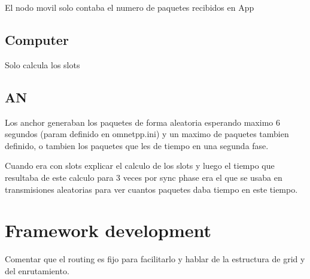El nodo movil solo contaba el numero de paquetes recibidos en App

\subsection{Computer}

Solo calcula los slots

\subsection{\ac{AN}}

Los anchor generaban los paquetes de forma aleatoria esperando maximo 6 segundos (param definido en omnetpp.ini) y un maximo de paquetes tambien 
definido, o tambien los paquetes que les de tiempo en una segunda fase.

Cuando era con slots explicar el calculo de los slots y luego el tiempo que resultaba de este calculo para 3 veces por sync phase era el que se 
usaba en transmisiones aleatorias para ver cuantos paquetes daba tiempo en este tiempo.


\section{Framework development}

Comentar que el routing es fijo para facilitarlo y hablar de la estructura de grid y del enrutamiento.
